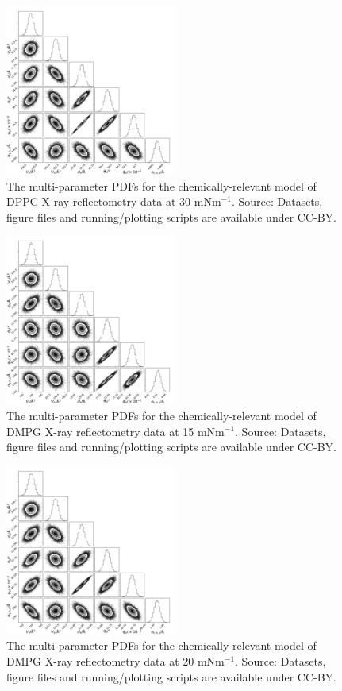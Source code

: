 \documentclass[11pt,a4paper]{paper}
\begin{document}
\begin{figure}
	\centering
	\includegraphics[width=0.50\textwidth]{figures/dppc4_all_corner}
	\caption{The multi-parameter PDFs for the chemically-relevant model of DPPC X-ray reflectometry data at 30 mNm$^{-1}$. Source: Datasets, figure files and running/plotting scripts are available under CC-BY.\cite{mccluskey_2018}}
	\label{fig:dppc5}
\end{figure}
\begin{figure}[h]
	\centering
	\includegraphics[width=0.50\textwidth]{figures/dmpg1_all_corner}
	\caption{The multi-parameter PDFs for the chemically-relevant model of DMPG X-ray reflectometry data at 15 mNm$^{-1}$. Source: Datasets, figure files and running/plotting scripts are available under CC-BY.\cite{mccluskey_2018}}
	\label{fig:dmpg2}
\end{figure}
\begin{figure}[h]
	\centering
	\includegraphics[width=0.50\textwidth]{figures/dmpg2_all_corner}
	\caption{The multi-parameter PDFs for the chemically-relevant model of DMPG X-ray reflectometry data at 20 mNm$^{-1}$. Source: Datasets, figure files and running/plotting scripts are available under CC-BY.\cite{mccluskey_2018}}
	\label{fig:dmpg3}
\end{figure}
\end{document}
